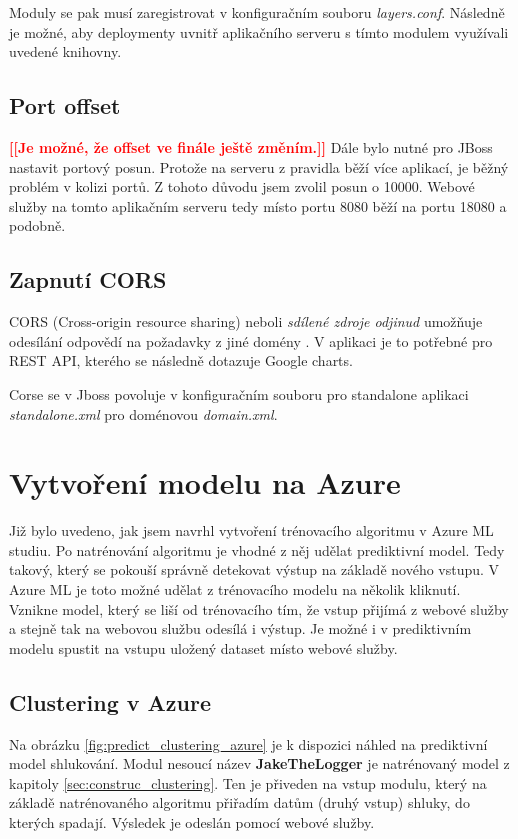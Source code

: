 \documentclass[thesis=M,czech]{FITthesis}[2012/10/20]
\newcommand{\todo}[1]{\textcolor{red}{\textbf{[[#1]]}}}
\begin{document}
		Moduly se pak musí zaregistrovat v konfiguračním souboru \textit{layers.conf}. Následně je možné, aby deploymenty uvnitř aplikačního serveru s tímto modulem využívali uvedené knihovny.
		
		\subsection{Port offset}
		\todo{Je možné, že offset ve finále ještě změním.}
		Dále bylo nutné pro JBoss nastavit portový posun. Protože na serveru z pravidla běží více aplikací, je běžný problém v kolizi portů. Z tohoto důvodu jsem zvolil posun o 10000. Webové služby na tomto aplikačním serveru tedy místo portu 8080 běží na portu 18080 a podobně.
		
		\subsection{Zapnutí CORS}
		CORS (Cross-origin resource sharing) neboli \textit{sdílené zdroje odjinud} umožňuje odesílání odpovědí na požadavky z jiné domény \cite{CORS}. V aplikaci je to potřebné pro REST API, kterého se následně dotazuje Google charts.
		
		Corse se v Jboss povoluje v konfiguračním souboru pro standalone aplikaci \textit{standalone.xml} pro doménovou \textit{domain.xml}.
		
	
	\section{Vytvoření modelu na Azure}
		Již bylo uvedeno, jak jsem navrhl vytvoření trénovacího algoritmu v Azure ML studiu. Po natrénování algoritmu je vhodné z něj udělat prediktivní model. Tedy takový, který se pokouší správně detekovat výstup na základě nového vstupu. V Azure ML je toto možné udělat z trénovacího modelu na několik kliknutí. Vznikne model, který se liší od trénovacího tím, že vstup přijímá z webové služby a stejně tak na webovou službu odesílá i výstup. Je možné i v prediktivním modelu spustit na vstupu uložený dataset místo webové služby.
		
		\subsection{Clustering v Azure}
			Na obrázku \ref{fig:predict_clustering_azure} je k dispozici náhled na prediktivní model shlukování. Modul nesoucí název \textbf{JakeTheLogger} je natrénovaný model z kapitoly \ref{sec:construc_clustering}. Ten je přiveden na vstup modulu, který na základě natrénovaného algoritmu přiřadím datům (druhý vstup) shluky, do kterých spadají. Výsledek je odeslán pomocí webové služby. 
			
\end{document}
